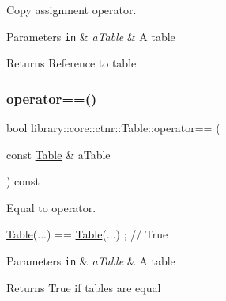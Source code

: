 Copy assignment operator. 


\begin{DoxyParams}[1]{Parameters}
\mbox{\tt in}  & {\em a\+Table} & A table \\
\hline
\end{DoxyParams}
\begin{DoxyReturn}{Returns}
Reference to table 
\end{DoxyReturn}
\mbox{\label{classlibrary_1_1core_1_1ctnr_1_1_table_ad74691bcfc56002a7eb5fc76f2a7cb9d}} 
\subsubsection{\texorpdfstring{operator==()}{operator==()}}
{\footnotesize\ttfamily bool library\+::core\+::ctnr\+::\+Table\+::operator== (\begin{DoxyParamCaption}\item[{const \hyperlink{classlibrary_1_1core_1_1ctnr_1_1_table}{Table} \&}]{a\+Table }\end{DoxyParamCaption}) const}



Equal to operator. 


\begin{DoxyCode}
\hyperlink{classlibrary_1_1core_1_1ctnr_1_1_table_a5b11121caa4288c3da642af7c6a5a632}{Table}(...) == \hyperlink{classlibrary_1_1core_1_1ctnr_1_1_table_a5b11121caa4288c3da642af7c6a5a632}{Table}(...) ; \textcolor{comment}{// True}
\end{DoxyCode}



\begin{DoxyParams}[1]{Parameters}
\mbox{\tt in}  & {\em a\+Table} & A table \\
\hline
\end{DoxyParams}
\begin{DoxyReturn}{Returns}
True if tables are equal 
\end{DoxyReturn}
\mbox{\label{classlibrary_1_1core_1_1ctnr_1_1_table_ae0b163e13fe6dc832c103ca7f89a0ca3}} 
